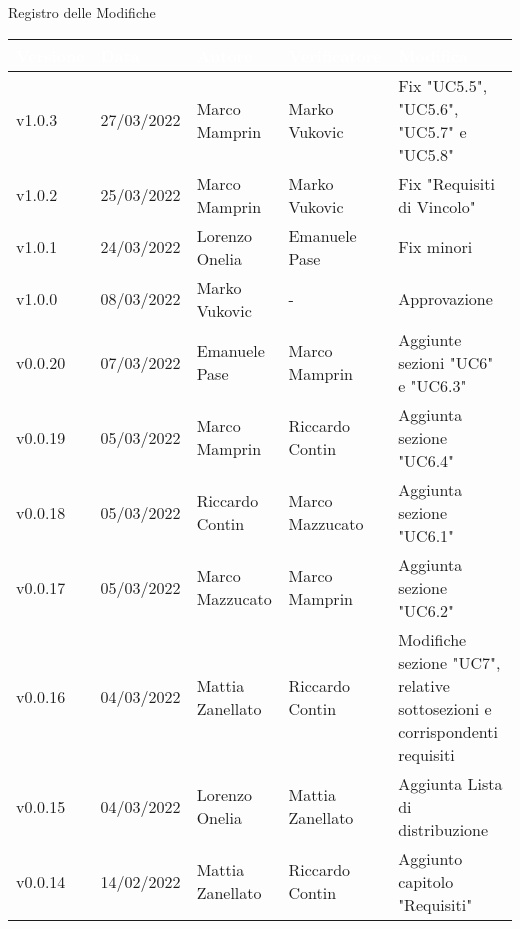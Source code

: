 \begin{center}
  \huge{Registro delle Modifiche}
\end{center}

\renewcommand\arraystretch{1,5}
{\centering
\begin{longtable}{|C{1.8cm}|C{2.1cm}|C{2cm}|C{2.4cm}|L{4.4cm}|}
  \hline
  \textcolor[HTML]{FFFFFF}{\textbf{Versione}} & \textcolor[HTML]{FFFFFF}{\textbf{Data}} & \textcolor[HTML]{FFFFFF}{\textbf{Autore}}  & \textcolor[HTML]{FFFFFF}{\textbf{Verificatore}} & \textcolor[HTML]{FFFFFF}{\textbf{Modifica}}    \\ \hline
  v1.0.3           & 27/03/2022   & Marco Mamprin & Marko Vukovic     & Fix "UC5.5", "UC5.6", "UC5.7" e "UC5.8"     \\ \hline
  v1.0.2           & 25/03/2022   & Marco Mamprin & Marko Vukovic      & Fix "Requisiti di Vincolo"     \\ \hline
  v1.0.1           & 24/03/2022   & Lorenzo Onelia  & Emanuele Pase    & Fix minori                  \\ \hline
  v1.0.0           & 08/03/2022   & Marko Vukovic & - & Approvazione     \\ \hline
  v0.0.20           & 07/03/2022    & Emanuele Pase  & Marco Mamprin         & Aggiunte sezioni "UC6" e "UC6.3" \\ \hline
  v0.0.19           & 05/03/2022    & Marco Mamprin  &  Riccardo Contin   & Aggiunta sezione "UC6.4"                   \\ \hline
  v0.0.18           & 05/03/2022    & Riccardo Contin &  Marco Mazzucato    & Aggiunta sezione "UC6.1" \\ \hline
  v0.0.17           & 05/03/2022    & Marco Mazzucato  & Marco Mamprin     & Aggiunta sezione "UC6.2"   \\ \hline
  v0.0.16           & 04/03/2022    & Mattia Zanellato &  Riccardo Contin      & Modifiche sezione "UC7", relative sottosezioni e corrispondenti requisiti \\ \hline
  v0.0.15       & 04/03/2022    & Lorenzo Onelia  & Mattia Zanellato     & Aggiunta Lista di distribuzione                  \\ \hline
  v0.0.14           & 14/02/2022    & Mattia Zanellato  & Riccardo Contin     & Aggiunto capitolo "Requisiti"                   \\ \hline

\end{longtable}}
